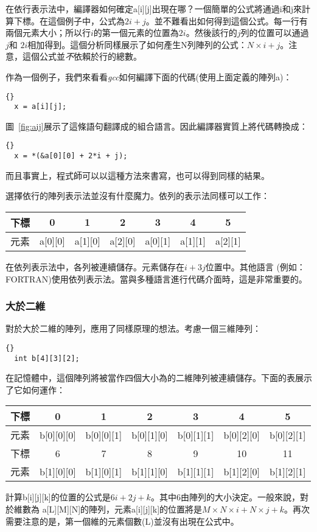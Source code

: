 在依行表示法中，編譯器如何確定{\code a[i][j]}出現在哪？一個簡單的公式將通過{\code i}和{\code j}來計算下標。在這個例子中，公式為$2i + j$。並不難看出如何得到這個公式。每一行有兩個元素大小；所以行$i$的第一個元素的位置為$2i$。然後該行的$j$列的位置可以通過$j$和 $2i$相加得到。這個分析同樣展示了如何產生{\code N}列陣列的公式：$N \times i + j$。注意，這個公式並\emph{不}依賴於行的總數。

作為一個例子，我們來看看\emph{gcc}如何編譯下面的代碼(使用上面定義的陣列{\code a})：
\begin{lstlisting}[stepnumber=0]{}
  x = a[i][j];
\end{lstlisting}
圖~\ref{fig:aij}展示了這條語句翻譯成的組合語言。因此編譯器實質上將代碼轉換成：
\begin{lstlisting}[stepnumber=0]{}
  x = *(&a[0][0] + 2*i + j);
\end{lstlisting}
而且事實上，程式師可以以這種方法來書寫，也可以得到同樣的結果。

選擇依行的陣列表示法並沒有什麼魔力。依列的表示法同樣可以工作：

\parbox{\textwidth}{
\vspace{0.5em}
\centering
\begin{tabular}{||l|c|c|c|c|c|c||}
\hline
下標 & 0 & 1 & 2 & 3 & 4 & 5 \\
\hline
元素 & a[0][0] & a[1][0] & a[2][0] & a[0][1] & a[1][1] & a[2][1]  \\
\hline
\end{tabular}
\vspace{0.5em} } \noindent
在依列表示法中，各列被連續儲存。元素{\code [i][j]}儲存在$i +
3j$位置中。其他語言
(例如：FORTRAN)使用依列表示法。當與多種語言進行代碼介面時，這是非常重要的。

\subsubsection{大於二維}
對於大於二維的陣列，應用了同樣原理的想法。考慮一個三維陣列：
\begin{lstlisting}[stepnumber=0]{}
  int b[4][3][2];
\end{lstlisting}
在記憶體中，這個陣列將被當作四個大小為{\code [3][2]}的二維陣列被連續儲存。下面的表展示了它如何運作：

\parbox{\textwidth}{
\vspace{0.5em}
\centering
\begin{tabular}{||l|c|c|c|c|c|c||}
\hline
下標 & 0 & 1 & 2 & 3 & 4 & 5  \\
\hline
元素 & b[0][0][0] & b[0][0][1]  & b[0][1][0] & b[0][1][1] & b[0][2][0]
&  b[0][2][1]  \\
\hline
\hline
下標 & 6 & 7 & 8 & 9 & 10 & 11 \\
\hline
元素 & b[1][0][0] & b[1][0][1] & b[1][1][0] & b[1][1][1]  & b[1][2][0]
& b[1][2][1] \\
\hline
\end{tabular}
\vspace{0.5em}
}
\noindent 計算{\code b[i][j][k]}的位置的公式是$6i + 2j + k$。其中6由{\code [3][2]}陣列的大小決定。一般來說，對於維數為{\code
a[L][M][N]}的陣列，元素{\code a[i][j][k]}的位置將是$M\times N\times i
+ N \times j + k$。再次需要注意的是，第一個維的元素個數({\code L})並沒有出現在公式中。

